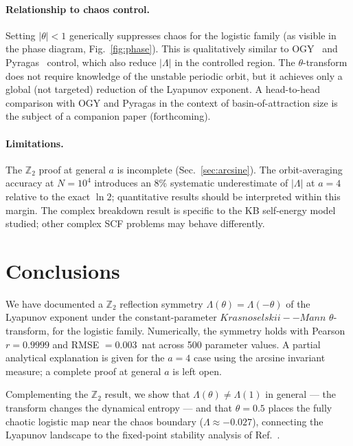 \documentclass[aps,pre,twocolumn,superscriptaddress,nofootinbib,
               longbibliography,floatfix]{revtex4-2}
\newcommand{\KM}{Krasnoselskii--Mann}
\newcommand{\Lam}{\Lambda}
\theoremstyle{plain}
\theoremstyle{remark}
\begin{document}
\paragraph{Relationship to chaos control.}
Setting $|\theta| < 1$ generically suppresses chaos for the
logistic family (as visible in the phase diagram,
Fig.~\ref{fig:phase}).  This is qualitatively similar to
OGY~\cite{OttGrebogiYorke1990} and
Pyragas~\cite{Pyragas1992} control, which also reduce
$|\Lambda|$ in the controlled region.  The $\theta$-transform
does not require knowledge of the unstable periodic orbit, but
it achieves only a global (not targeted) reduction of the
Lyapunov exponent.  A head-to-head comparison with OGY and
Pyragas in the context of basin-of-attraction size is the
subject of a companion paper (forthcoming).

\paragraph{Limitations.}
The $\mathbb{Z}_2$ proof at general $a$ is incomplete
(Sec.~\ref{sec:arcsine}).  The orbit-averaging accuracy
at $N = 10^4$ introduces an 8\% systematic underestimate
of $|\Lambda|$ at $a = 4$ relative to the exact $\ln 2$;
quantitative results should be interpreted within this margin.
The complex breakdown result is specific to the KB self-energy
model studied; other complex SCF problems may behave differently.

\section{Conclusions}
\label{sec:conclusions}

We have documented a $\mathbb{Z}_2$ reflection symmetry
$\Lam(\theta) = \Lam(-\theta)$ of the Lyapunov exponent under
the constant-parameter $\KM$ $\theta$-transform, for the logistic
family.  Numerically, the symmetry holds with Pearson
$r = 0.9999$ and RMSE $= 0.003$~nat across 500 parameter values.
A partial analytical explanation is given for the $a = 4$ case
using the arcsine invariant measure; a complete proof at
general $a$ is left open.

Complementing the $\mathbb{Z}_2$ result, we show that
$\Lam(\theta) \neq \Lam(1)$ in general — the transform changes
the dynamical entropy — and that $\theta = 0.5$ places the
fully chaotic logistic map near the chaos boundary
($\Lam \approx -0.027$), connecting the Lyapunov landscape
to the fixed-point stability analysis of Ref.~\cite{DysonPaper}.
\end{document}
